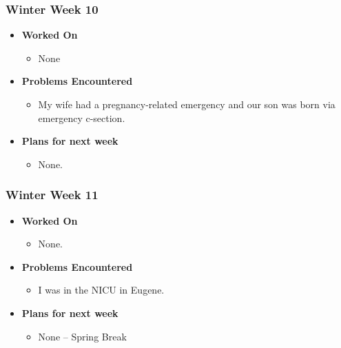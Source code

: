 \documentclass{article}
\begin{document}
\subsubsection{Winter Week 10}
\begin{itemize}
    \item {\textbf{Worked On}}
    \begin{itemize}
        \item None
    \end{itemize}

    \item {\textbf{Problems Encountered}}
    \begin{itemize}
        \item My wife had a pregnancy-related emergency and our son was born via emergency c-section.
    \end{itemize}

    \item{\textbf{Plans for next week}}
    \begin{itemize}
        \item None.
    \end{itemize}
\end{itemize}

\subsubsection{Winter Week 11}
\begin{itemize}
    \item {\textbf{Worked On}}
    \begin{itemize}
        \item None.
    \end{itemize}

    \item {\textbf{Problems Encountered}}
    \begin{itemize}
        \item I was in the NICU in Eugene.
    \end{itemize}

    \item{\textbf{Plans for next week}}
    \begin{itemize}
        \item None -- Spring Break
    \end{itemize}
\end{itemize}
\end{document}
